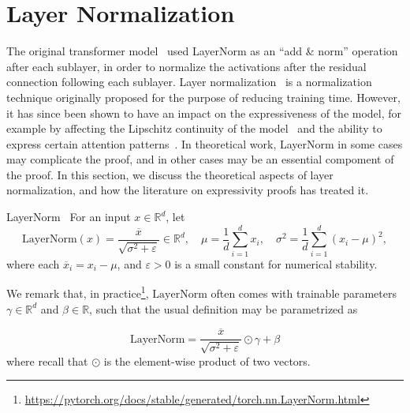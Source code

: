 \chapter{Layer Normalization}
\label{sec:layernorm}

The original transformer model~\citep{vaswani-etal-2017-attention} used LayerNorm as an ``add \& norm'' operation after each sublayer, in order to normalize the activations after the residual connection following each sublayer.
Layer normalization~\citep{ba2016layer} is a normalization technique originally proposed for the purpose of reducing training time.
However, it has since been shown to have an impact on the expressiveness of the model, for example by affecting the Lipschitz continuity of the model~\citep{hahn-2020-theoretical} and the ability to express certain attention patterns~\citep{brody2023expressivity}.
In theoretical work, LayerNorm in some cases may complicate the proof, and in other cases may be an essential compoment of the proof.
In this section, we discuss the theoretical aspects of layer normalization, and how the literature on expressivity proofs has treated it.

\begin{definition}{LayerNorm~\citep{ba2016layer}}{}
For an input \(x \in \mathbb{R}^{d}\), let
\begin{equation*}
    \mathrm{LayerNorm}(x) = \frac{\overline{x}}{\sqrt{\sigma^2 + \varepsilon}} \in \mathbb{R}^{d},
    \quad \mu = \frac{1}{d} \sum_{i = 1}^{d} x_i,
    \quad \sigma^2 = \frac{1}{d}\sum_{i = 1}^{d} (x_i - \mu)^2,
\end{equation*}
where each \(\overline{x}_i = x_i - \mu\), and \(\varepsilon > 0\) is a small constant for numerical stability.
\end{definition}

We remark that, in practice\footnote{\url{https://pytorch.org/docs/stable/generated/torch.nn.LayerNorm.html}},
\(\mathrm{LayerNorm}\) often comes with trainable parameters \(\gamma \in \mathbb{R}^{d}\) and \(\beta \in \mathbb{R}\), such that the usual definition may be parametrized as

\begin{equation*}
    \mathrm{LayerNorm} = \frac{\overline{x}}{\sqrt{\sigma^2 + \varepsilon}} \odot \gamma + \beta
\end{equation*}
where recall that \(\odot\) is the element-wise product of two vectors.


